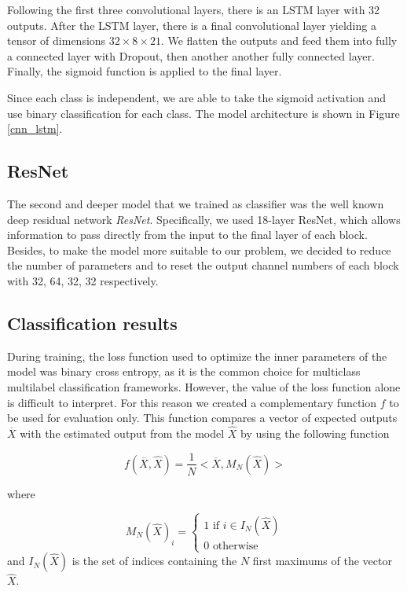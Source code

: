\documentclass[runningheads,a4paper]{llncs}
\begin{document}
Following the first three convolutional layers, there is an LSTM layer with 32 outputs. After the LSTM layer, there is a final convolutional layer yielding a tensor of dimensions $32\times 8 \times 21$. We flatten the outputs and feed them into fully a connected layer with Dropout, then another another fully connected layer. Finally, the sigmoid function is applied to the final layer. 

Since each class is independent, we are able to take the sigmoid activation and use binary classification for each class. The model architecture is shown in Figure \ref{cnn_lstm}.

\subsection{ResNet}

The second and deeper model that we trained as classifier was the well known deep residual network \emph{ResNet}. Specifically, we used 18-layer ResNet, which allows information to pass directly from the input to the final layer of each block. Besides, to make the model more suitable to our problem, we decided to reduce the number of parameters and to reset the output channel numbers of each block with 32, 64, 32, 32 respectively.

\subsection{Classification results}

During training, the loss function used to optimize the inner parameters of the model was binary cross entropy, as it is the common choice for multiclass multilabel classification frameworks. However, the value of the loss function alone is difficult to interpret. For this reason we created a complementary function $f$ to be used for evaluation only. This function compares a vector of expected outputs $\overline{X}$ with the estimated output from the model $\hat{X}$ by using the following function

\begin{equation}
f(\overline{X}, \hat{X}) = \frac{1}{N}<\overline{X}, M_N(\hat{X})>
\label{eval}
\end{equation}

where

\begin{equation}
M_N(\hat{X})_i = \left\{\begin{array}{ll}
1 \text{ if } i \in I_N(\hat{X})\\
0 \text{ otherwise}
\end{array}\right.
\label{NMax}
\end{equation}
and $I_N(\hat{X})$ is the set of indices containing the $N$ first maximums of the vector $\hat{X}$.
\end{document}
